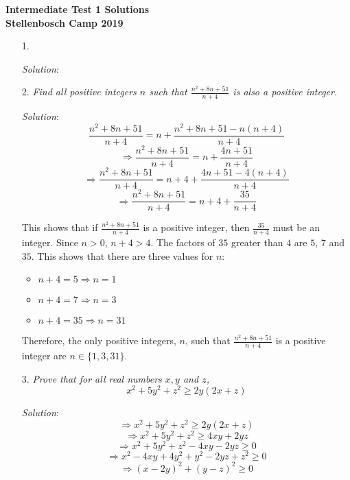 \documentclass{article}
\begin{document}
\begin{center}
  \textbf{\Large Intermediate Test 1 Solutions}
  \\ \vspace{1em}
  \textbf{\large Stellenbosch Camp 2019}
\end{center}


\begin{enumerate}[1.]

\item[1.] %
\textit{}

\textit{Solution}:
\vspace{6.81mm}

\item[2.] %
\textit{Find all positive integers $n$ such that $\frac{n^2 + 8n + 51}{n + 4}$ is also a positive integer.}

\textit{Solution}:
$$\frac{n^2 + 8n + 51}{n + 4} = n + \frac{n^2 + 8n + 51 - n(n + 4)}{n + 4}$$
$$\Rightarrow \frac{n^2 + 8n + 51}{n + 4} = n + \frac{4n + 51}{n + 4}$$
$$\Rightarrow \frac{n^2 + 8n + 51}{n + 4} = n + 4 + \frac{4n + 51 - 4(n + 4)}{n + 4}$$
$$\Rightarrow \frac{n^2 + 8n + 51}{n + 4} = n + 4 + \frac{35}{n + 4}$$

This shows that if $\frac{n^2 + 8n + 51}{n + 4}$ is a positive integer, then $\frac{35}{n + 4}$ must be an integer. Since $n > 0$, $n + 4 > 4$.
The factors of $35$ greater than $4$ are $5$, $7$ and $35$. This shows that there are three values for $n$:
\begin{itemize}
    \item $n + 4 = 5 \Rightarrow n = 1$
    \item $n + 4 = 7 \Rightarrow n = 3$
    \item $n + 4 = 35 \Rightarrow n = 31$
\end{itemize}

Therefore, the only positive integers, $n$, such that $\frac{n^2 + 8n + 51}{n + 4}$ is a positive integer are $n \in \{1, 3, 31\}.$

\vspace{6.81mm}

\item[3.] %
\textit{Prove that for all real numbers $x, y$ and $z$,
$$x^2 + 5y^2 + z^2 \ge 2y(2x + z)$$}

\textit{Solution}:
$$\Rightarrow x^2 + 5y^2 + z^2 \ge 2y(2x + z)$$
$$\Rightarrow x^2 + 5y^2 + z^2 \ge 4xy + 2yz$$
$$\Rightarrow x^2 + 5y^2 + z^2 - 4xy - 2yz \ge 0$$
$$\Rightarrow x^2 - 4xy + 4y^2 + y^2 - 2yz + z^2 \ge 0$$
$$\Rightarrow (x - 2y)^2 + (y - z)^2 \ge 0$$


\end{enumerate}
\end{document}
